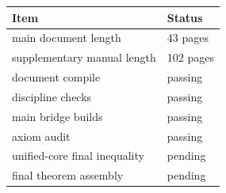 \begin{center}
\small
\begin{tabular}{@{}p{}p{}@{}}
\toprule
Item & Status \\
\midrule
main document length & 43 pages \\
supplementary manual length & 102 pages \\
document compile & passing \\
discipline checks & passing \\
main bridge builds & passing \\
axiom audit & passing \\
unified-core final inequality & pending \\
final theorem assembly & pending \\
\bottomrule
\end{tabular}
\end{center}
